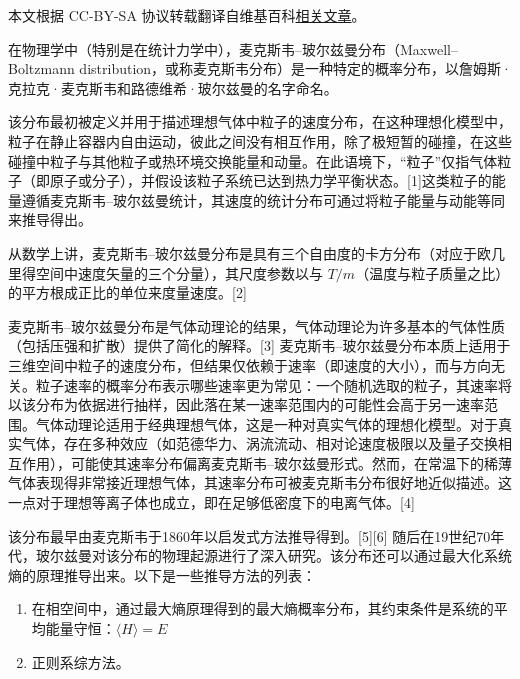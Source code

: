 
本文根据 CC-BY-SA 协议转载翻译自维基百科\href{https://en.wikipedia.org/wiki/Maxwell\%E2\%80\%93Boltzmann_distribution}{相关文章}。

在物理学中（特别是在统计力学中），麦克斯韦–玻尔兹曼分布（Maxwell–Boltzmann distribution，或称麦克斯韦分布）是一种特定的概率分布，以詹姆斯·克拉克·麦克斯韦和路德维希·玻尔兹曼的名字命名。

该分布最初被定义并用于描述理想气体中粒子的速度分布，在这种理想化模型中，粒子在静止容器内自由运动，彼此之间没有相互作用，除了极短暂的碰撞，在这些碰撞中粒子与其他粒子或热环境交换能量和动量。在此语境下，“粒子”仅指气体粒子（即原子或分子），并假设该粒子系统已达到热力学平衡状态。[1]这类粒子的能量遵循麦克斯韦–玻尔兹曼统计，其速度的统计分布可通过将粒子能量与动能等同来推导得出。

从数学上讲，麦克斯韦–玻尔兹曼分布是具有三个自由度的卡方分布（对应于欧几里得空间中速度矢量的三个分量），其尺度参数以与 $T/m$（温度与粒子质量之比）的平方根成正比的单位来度量速度。[2]

麦克斯韦–玻尔兹曼分布是气体动理论的结果，气体动理论为许多基本的气体性质（包括压强和扩散）提供了简化的解释。[3] 麦克斯韦–玻尔兹曼分布本质上适用于三维空间中粒子的速度分布，但结果仅依赖于速率（即速度的大小），而与方向无关。粒子速率的概率分布表示哪些速率更为常见：一个随机选取的粒子，其速率将以该分布为依据进行抽样，因此落在某一速率范围内的可能性会高于另一速率范围。气体动理论适用于经典理想气体，这是一种对真实气体的理想化模型。对于真实气体，存在多种效应（如范德华力、涡流流动、相对论速度极限以及量子交换相互作用），可能使其速率分布偏离麦克斯韦–玻尔兹曼形式。然而，在常温下的稀薄气体表现得非常接近理想气体，其速率分布可被麦克斯韦分布很好地近似描述。这一点对于理想等离子体也成立，即在足够低密度下的电离气体。[4]

该分布最早由麦克斯韦于1860年以启发式方法推导得到。[5][6] 随后在19世纪70年代，玻尔兹曼对该分布的物理起源进行了深入研究。该分布还可以通过最大化系统熵的原理推导出来。以下是一些推导方法的列表：
\begin{enumerate}
\item 在相空间中，通过最大熵原理得到的最大熵概率分布，其约束条件是系统的平均能量守恒：$\langle H \rangle = E$
\item 正则系综方法。
\end{enumerate}
